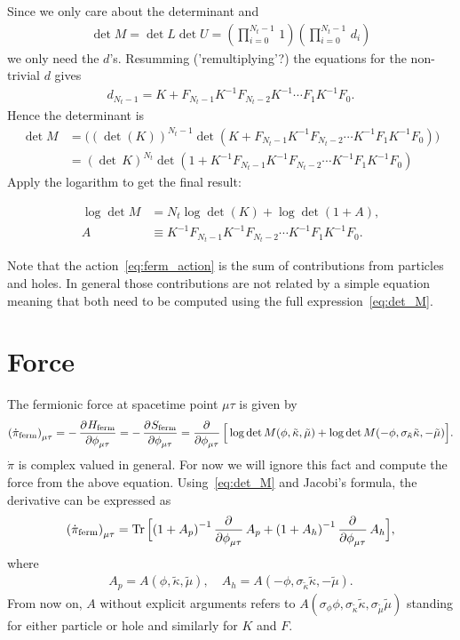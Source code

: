 \documentclass[a4paper, fleqn, twoside, notitlepage]{scrartcl}
\begin{document}
Since we only care about the determinant and
\begin{align}
  \det M = \det L \det U = (\prod_{i=0}^{N_t-1}\,1) (\prod_{i=0}^{N_t-1}\,d_i)
\end{align}
we only need the $d$'s.
Resumming ('remultiplying'?) the equations for the non-trivial $d$ gives
\begin{align}
  d_{N_t-1} = K + F_{N_t-1}K^{-1} F_{N_t-2}K^{-1} \cdots F_{1}K^{-1} F_{0}.
\end{align}
Hence the determinant is
\begin{align}
  \det M &= \big({(\det(K))}^{N_t-1} \det (K + F_{N_t-1}K^{-1} F_{N_t-2} \cdots K^{-1}F_{1}K^{-1} F_{0})\big)\\
         &= {(\det\,K)}^{N_t} \det(1 + K^{-1}F_{N_t-1}K^{-1} F_{N_t-2} \cdots K^{-1}F_{1}K^{-1} F_{0})
\end{align}
Apply the logarithm to get the final result:
\begin{resultbox}
  \vspace{-\baselineskip}
  \begin{align}
    \log \det M &= N_t \log \det(K)  + \log \det (1 + A),\label{eq:det_M}\\
    A &\equiv K^{-1}F_{N_t-1}K^{-1} F_{N_t-2} \cdots K^{-1}F_{1}K^{-1} F_{0}.\label{eq:def_A}
  \end{align}
\end{resultbox}
\noindent Note that the action~\eqref{eq:ferm_action} is the sum of contributions from particles and holes. In general those contributions are not related by a simple equation meaning that both need to be computed using the full expression~\eqref{eq:det_M}.
  
\section{Force}

The fermionic force at spacetime point $\mu\tau$ is given by
\begin{align}
  {(\dot{\pi}_{\text{ferm}})}_{\mu\tau} = -\dpd{H_{\text{ferm}}}{\phi_{\mu\tau}} = -\dpd{S_\text{ferm}}{\phi_{\mu\tau}} =  \dpd{}{\phi_{\mu\tau}} \Big[\log \det M(\phi, \tilde{\kappa}, \tilde{\mu}) + \log \det M(-\phi, \sigma_{\tilde{\kappa}}\tilde{\kappa}, -\tilde{\mu})\Big].
\end{align}
$\dot{\pi}$ is complex valued in general. For now we will ignore this fact and compute the force from the above equation.
Using~\eqref{eq:det_M} and Jacobi's formula, the derivative can be expressed as
\begin{align}
  {(\dot{\pi}_{\text{ferm}})}_{\mu\tau} = \Tr \Big[{(1+A_p)}^{-1}\dpd{}{\phi_{\mu\tau}}A_p + {(1+A_h)}^{-1}\dpd{}{\phi_{\mu\tau}}A_h\Big],
\end{align}
where
\begin{align}
  A_p = A(\phi, \tilde{\kappa}, \tilde{\mu}), \quad  A_h = A(-\phi, \sigma_{\tilde{\kappa}}\tilde{\kappa}, -\tilde{\mu}).
\end{align}
From now on, $A$ without explicit arguments refers to $A(\sigma_\phi\phi, \sigma_{\tilde{\kappa}}\tilde{\kappa}, \sigma_{\tilde{\mu}}\tilde{\mu})$ standing for either particle or hole and similarly for $K$ and $F$.\\
\end{document}
